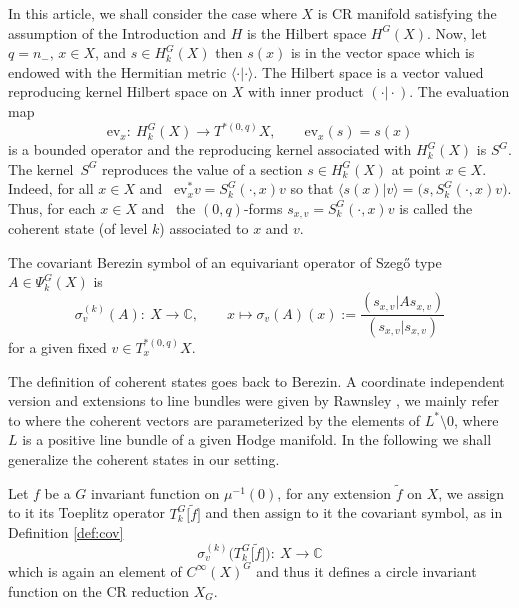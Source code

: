 \documentclass[pdftex]{sigma}
\numberwithin{equation}{section}
\begin{document}
	In this article, we shall consider the case where $X$ is CR manifold satisfying the assumption of the Introduction and $H$ is the Hilbert space $H^{G}(X)$. Now, let $q=n_-$, $x\in X$, and $s\in H^{G}_k(X)$ then $s(x)$ is in the vector space  which is endowed with the Hermitian metric $\langle \cdot \vert\cdot \rangle$. The Hilbert space  is a vector valued reproducing kernel Hilbert space on $X$ with inner product $( \cdot\vert\cdot )$. The evaluation map
	\[\mathrm{ev}_x \colon\ H^{G}_k(X) \rightarrow T^{* (0,q)}X,\qquad \mathrm{ev}_x(s)=s(x)\]
	is a bounded operator and the reproducing kernel associated with $H^{G}_k(X)$ is $S^{G}$. The kernel~$S^{G}$ reproduces the value of a section $s\in H^{G}_k(X)$ at point $x\in X$. Indeed, for all $x\in X$ and~
	$\mathrm{ev}_x^* v = S^{G}_k(\cdot, x) v $
	so that
	$\langle s(x)\vert v \rangle = \bigl(s, S^{G}_k(\cdot, x)v\bigr)$.
	Thus, for each $x\in X$ and~ the $(0,q)$-forms $s_{x,v}=S^{G}_k(\cdot, x) v$ is called the coherent state (of level $k$) associated to $x$ and $v$.
	
	\begin{Definition} \label{def:cov}
		The covariant Berezin symbol  of an equivariant operator of Szeg\H{o} type~${A\in \Psi^G_k(X)}$ is
		\[\sigma_v^{(k)}(A) \colon\ X \rightarrow \mathbb{C},\qquad x\mapsto \sigma_v(A)(x):=\frac{(s_{x,v}\vert As_{x,v})}{(s_{x,v}\vert s_{x,v})} \]
		for a given fixed $v\in T^{*(0,q)}_xX$.
	\end{Definition}
	
	
	\begin{Remark}
		The definition of coherent states goes back to Berezin. A coordinate independent version and extensions to line bundles were given by Rawnsley \cite{r}, we mainly refer to \cite{schl2} where the coherent vectors are parameterized by the elements of $L^*\setminus 0$, where $L$ is a positive line bundle of a given Hodge manifold. In the following we shall generalize the coherent states in our setting.
	\end{Remark}
	
	Let $f$ be a $G$ invariant function on $\mu^{-1}(0)$, for any extension $\widetilde{f}$ on $X$, we assign to it its Toeplitz operator $T^{G}_{k}\big[\widetilde{f}\big]$ and then assign to it the covariant symbol, as in Definition \ref{def:cov} \[\sigma_v^{(k)}\bigl(T^{G}_{k}\big[\widetilde{f}\big]\bigr) \colon\ X \rightarrow \mathbb{C}\] which is again an element of $C^{\infty}(X)^{G}$ and thus it defines a circle invariant function on the CR reduction $X_G$.
	
\end{document}
